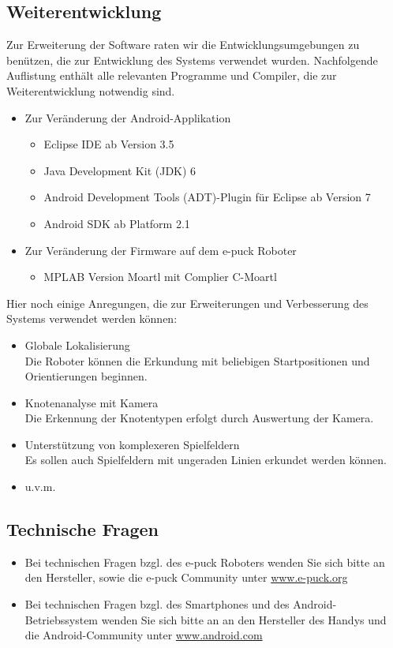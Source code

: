 \documentclass[10pt,a4paper]{article}
\begin{document}
	\subsection{Weiterentwicklung}
	Zur Erweiterung der Software raten wir die Entwicklungsumgebungen zu ben\"utzen, die zur Entwicklung des Systems verwendet wurden.
	Nachfolgende Auflistung enth\"alt alle relevanten Programme und Compiler, die zur Weiterentwicklung notwendig sind.
	\begin{itemize}
		\item{Zur Ver\"anderung der Android-Applikation}
		\begin{itemize}
			\item{Eclipse IDE ab Version 3.5}
			\item{Java Development Kit (JDK) 6}
			\item{Android Development Tools (ADT)-Plugin f\"ur Eclipse ab Version 7}
			\item{Android SDK ab Platform 2.1}
		\end{itemize}
		\item{Zur Ver\"anderung der Firmware auf dem e-puck Roboter}
		\begin{itemize}
			\item{MPLAB Version Moartl mit Complier C-Moartl}
		\end{itemize}
	\end{itemize}
	Hier noch einige Anregungen, die zur Erweiterungen und Verbesserung des Systems verwendet werden k\"onnen:
	\begin{itemize}
		\item{Globale Lokalisierung} \\ Die Roboter k\"onnen die Erkundung mit beliebigen Startpositionen und Orientierungen beginnen.
		\item{Knotenanalyse mit Kamera} \\ Die Erkennung der Knotentypen erfolgt durch Auswertung der Kamera.
		\item{Unterst\"utzung von komplexeren Spielfeldern} \\ Es sollen auch Spielfeldern mit ungeraden Linien erkundet werden k\"onnen.
		\item{u.v.m.}
	\end{itemize}
	\subsection{Technische Fragen}
		\begin{itemize}
			\item{Bei technischen Fragen bzgl. des e-puck Roboters wenden Sie sich bitte an den Hersteller, sowie die e-puck Community unter
				\url{www.e-puck.org}}
			\item{Bei technischen Fragen bzgl. des Smartphones und des Android-Betriebssystem wenden Sie sich bitte an an den Hersteller des Handys
				und die Android-Community unter \url{www.android.com}}
		\end{itemize}
				 
		
\end{document}
